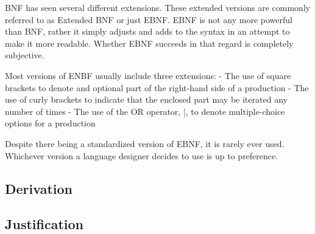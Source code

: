 BNF has seen several different extensions.
These extended versions are commonly referred to as Extended BNF or just EBNF. 
EBNF is not any more powerful than BNF, rather it simply adjusts and adds to the syntax in an attempt to make it more readable.
Whether EBNF succeeds in that regard is completely subjective. 

Most versions of ENBF usually include three extensions:
- The use of square brackets to denote and optional part of the right-hand side of a production
- The use of curly brackets to indicate that the enclosed part may be iterated any number of times
- The use of the OR operator, |, to denote multiple-choice options for a production

Despite there being a standardized version of EBNF, it is rarely ever used. 
Whichever version a language designer decides to use is up to preference.

\subsection{Derivation}


\subsection{Justification}
